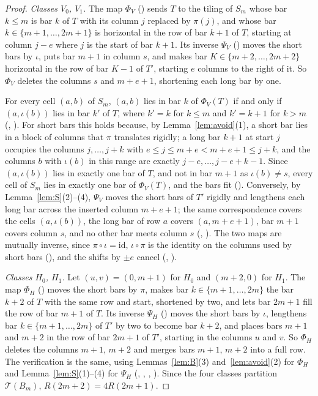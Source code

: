 \documentclass[11pt]{amsart}
\theoremstyle{plain}
\theoremstyle{definition}
\newcommand{\T}{\mathcal{T}}
\newcommand{\Sm}{S_m}
\newcommand{\Bm}{B_m}
\begin{document}
\begin{proof}
\emph{Classes $V_0$, $V_1$.} The map $\Phi_V$ () sends $T$ to the tiling of $\Sm$ whose bar $k\le m$ is bar $k$ of $T$ with its column $j$ replaced by $\pi(j)$, and whose bar $k\in\{m+1,\dots,2m+1\}$ is horizontal in the row of bar $k+1$ of $T$, starting at column $j-e$ where $j$ is the start of bar $k+1$. Its inverse $\Psi_V$ () moves the short bars by $\iota$, puts bar $m+1$ in column $s$, and makes bar $K\in\{m+2,\dots,2m+2\}$ horizontal in the row of bar $K-1$ of $T'$, starting $e$ columns to the right of it. So $\Phi_V$ deletes the columns $s$ and $m+e+1$, shortening each long bar by one.

For every cell $(a,b)$ of $\Sm$, $(a,b)$ lies in bar $k$ of $\Phi_V(T)$ if and only if $(a,\iota(b))$ lies in bar $k'$ of $T$, where $k'=k$ for $k\le m$ and $k'=k+1$ for $k>m$ (, ). For short bars this holds because, by Lemma~\ref{lem:avoid}(1), a short bar lies in a block of columns that $\pi$ translates rigidly; a long bar $k+1$ at start $j$ occupies the columns $j,\dots,j+k$ with $e\le j\le m+e<m+e+1\le j+k$, and the columns $b$ with $\iota(b)$ in this range are exactly $j-e,\dots,j-e+k-1$. Since $(a,\iota(b))$ lies in exactly one bar of $T$, and not in bar $m+1$ as $\iota(b)\ne s$, every cell of $\Sm$ lies in exactly one bar of $\Phi_V(T)$, and the bars fit (). Conversely, by Lemma~\ref{lem:S}(2)--(4), $\Psi_V$ moves the short bars of $T'$ rigidly and lengthens each long bar across the inserted column $m+e+1$; the same correspondence covers the cells $(a,\iota(b))$, the long bar of row $a$ covers $(a,m+e+1)$, bar $m+1$ covers column $s$, and no other bar meets column $s$ (, ). The two maps are mutually inverse, since $\pi\circ\iota=\mathrm{id}$, $\iota\circ\pi$ is the identity on the columns used by short bars (), and the shifts by $\pm e$ cancel (, ).

\emph{Classes $H_0$, $H_1$.} Let $(u,v)=(0,m+1)$ for $H_0$ and $(m+2,0)$ for $H_1$. The map $\Phi_H$ () moves the short bars by $\pi$, makes bar $k\in\{m+1,\dots,2m\}$ the bar $k+2$ of $T$ with the same row and start, shortened by two, and lets bar $2m+1$ fill the row of bar $m+1$ of $T$. Its inverse $\Psi_H$ () moves the short bars by $\iota$, lengthens bar $k\in\{m+1,\dots,2m\}$ of $T'$ by two to become bar $k+2$, and places bars $m+1$ and $m+2$ in the row of bar $2m+1$ of $T'$, starting in the columns $u$ and $v$. So $\Phi_H$ deletes the columns $m+1$, $m+2$ and merges bars $m+1$, $m+2$ into a full row. The verification is the same, using Lemmas~\ref{lem:B}(3) and~\ref{lem:avoid}(2) for $\Phi_H$ and Lemma~\ref{lem:S}(1)--(4) for $\Psi_H$ (, , , ). Since the four classes partition $\T(\Bm)$, $R(2m+2)=4R(2m+1)$.
\end{proof}
\end{document}
